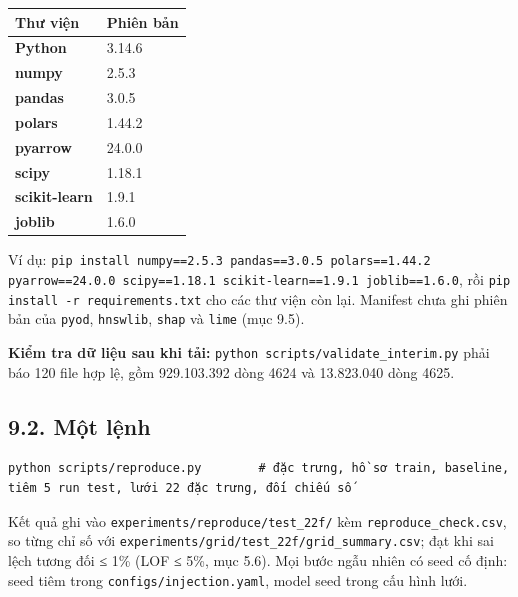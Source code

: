 \documentclass[
  11pt,
]{article}
\begin{document}
\begin{longtable}[]{@{}ll@{}}
\toprule\noalign{}
Thư viện & Phiên bản \\
\midrule\noalign{}
\endhead
\bottomrule\noalign{}
\endlastfoot
\textbf{Python} & 3.14.6 \\
\textbf{numpy} & 2.5.3 \\
\textbf{pandas} & 3.0.5 \\
\textbf{polars} & 1.44.2 \\
\textbf{pyarrow} & 24.0.0 \\
\textbf{scipy} & 1.18.1 \\
\textbf{scikit-learn} & 1.9.1 \\
\textbf{joblib} & 1.6.0 \\
\end{longtable}

Ví dụ:
\texttt{pip install numpy=\allowbreak{}=\allowbreak{}2.\allowbreak{}5.\allowbreak{}3 pandas=\allowbreak{}=\allowbreak{}3.\allowbreak{}0.\allowbreak{}5 polars=\allowbreak{}=\allowbreak{}1.\allowbreak{}44.\allowbreak{}2 pyarrow=\allowbreak{}=\allowbreak{}24.\allowbreak{}0.\allowbreak{}0 scipy=\allowbreak{}=\allowbreak{}1.\allowbreak{}18.\allowbreak{}1 scikit-learn=\allowbreak{}=\allowbreak{}1.\allowbreak{}9.\allowbreak{}1 joblib=\allowbreak{}=\allowbreak{}1.\allowbreak{}6.\allowbreak{}0},
rồi \texttt{pip install -r requirements.\allowbreak{}txt} cho các thư
viện còn lại. Manifest chưa ghi phiên bản của \texttt{pyod},
\texttt{hnswlib}, \texttt{shap} và \texttt{lime} (mục 9.5).

\textbf{Kiểm tra dữ liệu sau khi tải:}
\texttt{python scripts/\allowbreak{}validate\_\allowbreak{}interim.\allowbreak{}py}
phải báo 120 file hợp lệ, gồm 929.103.392 dòng 4624 và 13.823.040 dòng
4625.

\hypertarget{mux1ed9t-lux1ec7nh}{%
\subsection{9.2. Một lệnh}\label{mux1ed9t-lux1ec7nh}}

\begin{Verbatim}[breaklines,breakanywhere,fontsize=\footnotesize]
python scripts/reproduce.py        # đặc trưng, hồ sơ train, baseline, tiêm 5 run test, lưới 22 đặc trưng, đối chiếu số
\end{Verbatim}

Kết quả ghi vào
\texttt{experiments/\allowbreak{}reproduce/\allowbreak{}test\_\allowbreak{}22f/\allowbreak{}}
kèm \texttt{reproduce\_\allowbreak{}check.\allowbreak{}csv}, so từng chỉ
số với
\texttt{experiments/\allowbreak{}grid/\allowbreak{}test\_\allowbreak{}22f/\allowbreak{}grid\_\allowbreak{}summary.\allowbreak{}csv};
đạt khi sai lệch tương đối ≤ 1\% (LOF ≤ 5\%, mục 5.6). Mọi bước ngẫu
nhiên có seed cố định: seed tiêm trong
\texttt{configs/\allowbreak{}injection.\allowbreak{}yaml}, model seed
trong cấu hình lưới.
\end{document}
